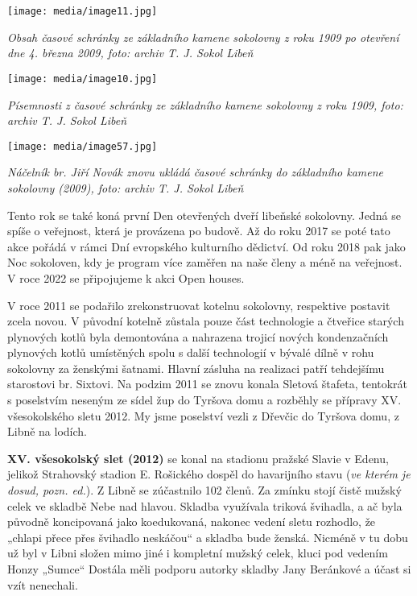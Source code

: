 \texttt{[image: media/image11.jpg]}

\emph{Obsah časové schránky ze základního kamene sokolovny z roku 1909
po otevření dne 4. března 2009, foto: archiv T. J. Sokol Libeň}

\texttt{[image: media/image10.jpg]}

\emph{Písemnosti z časové schránky ze základního kamene sokolovny z roku
1909, foto: archiv T. J. Sokol Libeň}

\texttt{[image: media/image57.jpg]}

\emph{Náčelník br. Jiří Novák znovu ukládá časové schránky do základního
kamene sokolovny (2009), foto: archiv T. J. Sokol Libeň}

Tento rok se také koná první Den otevřených dveří libeňské sokolovny.
Jedná se spíše o veřejnost, která je provázena po budově. Až do roku
2017 se poté tato akce pořádá v rámci Dní evropského kulturního
dědictví. Od roku 2018 pak jako Noc sokoloven, kdy je program více
zaměřen na naše členy a méně na veřejnost. V roce 2022 se připojujeme k
akci Open houses.

V roce 2011 se podařilo zrekonstruovat kotelnu sokolovny, respektive
postavit zcela novou. V původní kotelně zůstala pouze část technologie a
čtveřice starých plynových kotlů byla demontována a nahrazena trojicí
nových kondenzačních plynových kotlů umístěných spolu s další
technologií v bývalé dílně v rohu sokolovny za ženskými šatnami. Hlavní
zásluha na realizaci patří tehdejšímu starostovi br. Sixtovi. Na podzim
2011 se znovu konala Sletová štafeta, tentokrát s poselstvím neseným ze
sídel žup do Tyršova domu a rozběhly se přípravy XV. všesokolského sletu
2012. My jsme poselství vezli z Dřevčic do Tyršova domu, z Libně na
lodích.

\textbf{XV. všesokolský slet (2012)} se konal na stadionu pražské Slavie
v Edenu, jelikož Strahovský stadion E. Rošického dospěl do havarijního
stavu (\emph{ve kterém je dosud, pozn. ed.}). Z Libně se zúčastnilo 102
členů. Za zmínku stojí čistě mužský celek ve skladbě Nebe nad hlavou.
Skladba využívala triková švihadla, a ač byla původně koncipovaná jako
koedukovaná, nakonec vedení sletu rozhodlo, že „chlapi přece přes
švihadlo neskáčou`` a skladba bude ženská. Nicméně v tu dobu už byl v
Libni složen mimo jiné i kompletní mužský celek, kluci pod vedením Honzy
„Sumce`` Dostála měli podporu autorky skladby Jany Beránkové a účast si
vzít nenechali.

